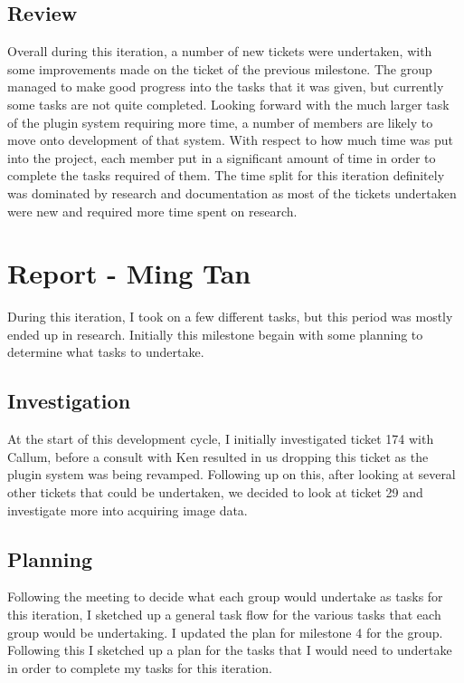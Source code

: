 \documentclass{article}
\begin{document}
\subsection{Review}
Overall during this iteration, a number of new tickets were undertaken, with some improvements made on the ticket of the previous milestone. The group managed to make good progress into the tasks that it was given, but currently some tasks are not quite completed. Looking forward with the much larger task of the plugin system requiring more time, a number of members are likely to move onto development of that system. With respect to how much time was put into the project, each member put in a significant amount of time in order to complete the tasks required of them. The time split for this iteration definitely was dominated by research and documentation as most of the tickets undertaken were new and required more time spent on research.

\newpage{}

\section{Report - Ming Tan}

During this iteration, I took on a few different tasks, but this period was mostly ended up in research. Initially this milestone begain with some planning to determine what tasks to undertake.

\subsection{Investigation}

At the start of this development cycle, I initially investigated ticket 174 with Callum, before a consult with Ken resulted in us dropping this ticket as the plugin system was being revamped. Following up on this, after looking at several other tickets that could be undertaken, we decided to look at ticket 29 and investigate more into acquiring image data.

\subsection{Planning}

Following the meeting to decide what each group would undertake as tasks for this iteration, I sketched up a general task flow for the various tasks that each group would be undertaking. I updated the plan for milestone 4 for the group. Following this I sketched up a plan for the tasks that I would need to undertake in order to complete my tasks for this iteration.
\end{document}
